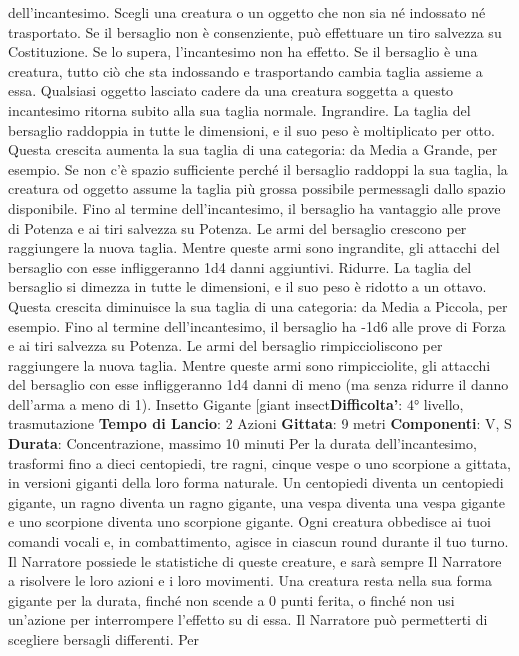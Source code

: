 \begin{multicols}{2}
dell’incantesimo. Scegli una creatura o un oggetto che
non sia né indossato né trasportato. Se il bersaglio non
è consenziente, può effettuare un tiro salvezza su
Costituzione. Se lo supera, l’incantesimo non ha effetto.
Se il bersaglio è una creatura, tutto ciò che sta
indossando e trasportando cambia taglia assieme a
essa. Qualsiasi oggetto lasciato cadere da una creatura
soggetta a questo incantesimo ritorna subito alla sua
taglia normale.
Ingrandire. La taglia del bersaglio raddoppia in tutte le
dimensioni, e il suo peso è moltiplicato per otto. Questa
crescita aumenta la sua taglia di una categoria: da
Media a Grande, per esempio. Se non c’è spazio
sufficiente perché il bersaglio raddoppi la sua taglia, la
creatura od oggetto assume la taglia più grossa
possibile permessagli dallo spazio disponibile. Fino al
termine dell’incantesimo, il bersaglio ha vantaggio alle
prove di Potenza e ai tiri salvezza su Potenza. Le armi del
bersaglio crescono per raggiungere la nuova taglia.
Mentre queste armi sono ingrandite, gli attacchi del
bersaglio con esse infliggeranno 1d4 danni aggiuntivi.
Ridurre. La taglia del bersaglio si dimezza in tutte le
dimensioni, e il suo peso è ridotto a un ottavo. Questa
crescita diminuisce la sua taglia di una categoria: da
Media a Piccola, per esempio. Fino al termine
dell’incantesimo, il bersaglio ha -1d6 alle prove di
Forza e ai tiri salvezza su Potenza. Le armi del bersaglio
rimpiccioliscono per raggiungere la nuova taglia. Mentre
queste armi sono rimpicciolite, gli attacchi del bersaglio
con esse infliggeranno 1d4 danni di meno (ma senza
ridurre il danno dell’arma a meno di 1).
Insetto Gigante
[giant insect\textbf{Difficolta'}:
4° livello, trasmutazione
\textbf{Tempo di Lancio}: 2 Azioni
\textbf{Gittata}: 9 metri
\textbf{Componenti}: V, S
\textbf{Durata}: Concentrazione, massimo 10 minuti
Per la durata dell’incantesimo, trasformi fino a dieci
centopiedi, tre ragni, cinque vespe o uno scorpione a
gittata, in versioni giganti della loro forma naturale. Un
centopiedi diventa un centopiedi gigante, un ragno
diventa un ragno gigante, una vespa diventa una vespa
gigante e uno scorpione diventa uno scorpione gigante.
Ogni creatura obbedisce ai tuoi comandi vocali e, in
combattimento, agisce in ciascun round durante il tuo
turno. Il Narratore possiede le statistiche di queste creature, e
sarà sempre Il Narratore a risolvere le loro azioni e i loro
movimenti.
Una creatura resta nella sua forma gigante per la
durata, finché non scende a 0 punti ferita, o finché non
usi un’azione per interrompere l’effetto su di essa.
Il Narratore può permetterti di scegliere bersagli differenti. Per

\end{multicols}
